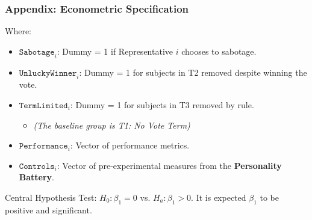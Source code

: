 \documentclass[10pt]{beamer}
\begin{document}
\begin{frame}
    \frametitle{Appendix: Econometric Specification}
    \label{slide:specification}
    \begin{block}{Where:}
        \begin{itemize}
            \item $\texttt{Sabotage}_i$: {\small Dummy = 1 if Representative $i$ chooses to sabotage.}
            \item $\texttt{UnluckyWinner}_i$: {\small Dummy = 1 for subjects in T2 removed despite winning the vote.}
            \item $\texttt{TermLimited}_i$: {\small Dummy = 1 for subjects in T3 removed by rule.}
                \begin{itemize}
                    \item \textit{\small(The baseline group is T1: No Vote Term)}
                \end{itemize}
            \item $\texttt{Performance}_i$: {\small Vector of performance metrics.}
            \item $\texttt{Controls}_i$: {\small Vector of pre-experimental measures from the \textbf{Personality Battery}.}
        \end{itemize}
    \end{block}
    \begin{block}{Central Hypothesis Test:}
        $H_0: \beta_1 = 0$ vs. $H_a: \beta_1 > 0$. It is expected $\beta_1$ to be positive and significant.
    \end{block}
    \hyperlink{slide:metrics}{} 
\end{frame}
\end{document}
